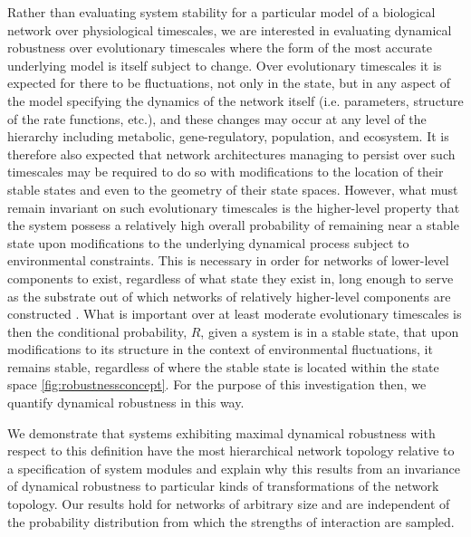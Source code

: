 Rather than evaluating system stability for a particular model of a biological network over physiological timescales, we are interested in evaluating dynamical robustness over evolutionary timescales where the form of the most accurate underlying model is itself subject to change. Over evolutionary timescales it is expected for there to be fluctuations, not only in the state, but in any aspect of the model specifying the dynamics of the network itself (i.e. parameters, structure of the rate functions, etc.), and these changes may occur at any level of the hierarchy including metabolic, gene-regulatory, population, and ecosystem. It is therefore also expected that network architectures managing to persist over such timescales may be required to do so with modifications to the location of their stable states and even to the geometry of their state spaces. However, what must remain invariant on such evolutionary timescales is the higher-level property that the system possess a relatively high overall probability of remaining near a stable state upon modifications to the underlying dynamical process subject to environmental constraints. This is necessary in order for networks of lower-level components to exist, regardless of what state they exist in, long enough to serve as the substrate out of which networks of relatively higher-level components are constructed \cite{Simon1962,Simon2002}. What is important over at least moderate evolutionary timescales is then the conditional probability, $R$, given a system is in a stable state, that upon modifications to its structure in the context of environmental fluctuations, it remains stable, regardless of where the stable state is located within the state space \ref{fig:robustnessconcept}. For the purpose of this investigation then, we quantify dynamical robustness in this way.

We demonstrate that systems exhibiting maximal dynamical robustness with respect to this definition have the most hierarchical network topology relative to a specification of system modules and explain why this results from an invariance of dynamical robustness to particular kinds of transformations of the network topology. Our results hold for networks of arbitrary size and are independent of the probability distribution from which the strengths of interaction are sampled.
